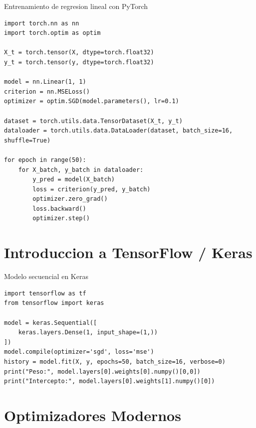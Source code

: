 \documentclass[aspectratio=169, 10pt, xcolor=table]{beamer}
\begin{document}
\begin{frame}[fragile]{Entrenamiento de regresion lineal con PyTorch}
    \begin{lstlisting}
import torch.nn as nn
import torch.optim as optim

X_t = torch.tensor(X, dtype=torch.float32)
y_t = torch.tensor(y, dtype=torch.float32)

model = nn.Linear(1, 1)
criterion = nn.MSELoss()
optimizer = optim.SGD(model.parameters(), lr=0.1)

dataset = torch.utils.data.TensorDataset(X_t, y_t)
dataloader = torch.utils.data.DataLoader(dataset, batch_size=16, shuffle=True)

for epoch in range(50):
    for X_batch, y_batch in dataloader:
        y_pred = model(X_batch)
        loss = criterion(y_pred, y_batch)
        optimizer.zero_grad()
        loss.backward()
        optimizer.step()
    \end{lstlisting}
\end{frame}

\section{Introduccion a TensorFlow / Keras}

\begin{frame}[fragile]{Modelo secuencial en Keras}
    \begin{lstlisting}
import tensorflow as tf
from tensorflow import keras

model = keras.Sequential([
    keras.layers.Dense(1, input_shape=(1,))
])
model.compile(optimizer='sgd', loss='mse')
history = model.fit(X, y, epochs=50, batch_size=16, verbose=0)
print("Peso:", model.layers[0].weights[0].numpy()[0,0])
print("Intercepto:", model.layers[0].weights[1].numpy()[0])
    \end{lstlisting}
\end{frame}

\section{Optimizadores Modernos}
\end{document}

